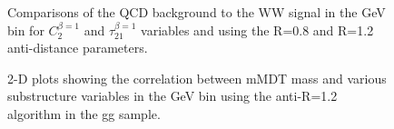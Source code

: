 \begin{figure}
\begin{center}
\caption{Comparisons of the QCD background to the WW signal in the  GeV bin for $C_2^{\beta=1}$ and $\tau_{21}^{\beta=1}$ variables
  and using the R=0.8 and R=1.2 anti-\kT distance parameters.}
\label{fig:pt500_subst_AKt_R08_R12}
\end{center}
\end{figure}


\begin{figure}
\begin{center}
\caption{2-D plots showing the correlation between mMDT mass and
  various substructure variables in the  GeV bin using the
  anti-\kT R=1.2 algorithm in the gg sample.}
\label{fig:pt500_2d_mmdt_AKt_R12}
\end{center}
\end{figure}


